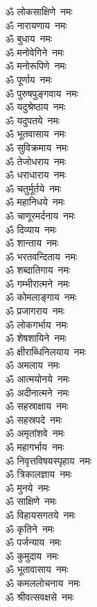 \begin{multicols}{2}
\begin{flushleft}
ॐ लोकसाक्षिणे~नमः\\
ॐ नारायणाय~नमः\\
ॐ बुधाय~नमः\\
ॐ मनोवेगिने~नमः\\
ॐ मनोरूपिणे~नमः\\
ॐ पूर्णाय~नमः\hfill{}\\
ॐ पुरुषपुङ्गवाय~नमः\\
ॐ यदुश्रेष्ठाय~नमः\\
ॐ यदुपतये~नमः\\
ॐ भूतवासाय~नमः\\
ॐ सुविक्रमाय~नमः\\
ॐ तेजोधराय~नमः\\
ॐ धराधाराय~नमः\\
ॐ चतुर्मूर्तये~नमः\\
ॐ महानिधये~नमः\\
ॐ चाणूरमर्दनाय~नमः\hfill{}\\
ॐ दिव्याय~नमः\\
ॐ शान्ताय~नमः\\
ॐ भरतवन्दिताय~नमः\\
ॐ शब्दातिगाय~नमः\\
ॐ गम्भीरात्मने~नमः\\
ॐ कोमलाङ्गाय~नमः\\
ॐ प्रजागराय~नमः\\
ॐ लोकगर्भाय~नमः\\
ॐ शेषशायिने~नमः\\
ॐ क्षीराब्धिनिलयाय~नमः\hfill{}\\
ॐ अमलाय~नमः\\
ॐ आत्मयोनये~नमः\\
ॐ अदीनात्मने~नमः\\
ॐ सहस्राक्षाय~नमः\\
ॐ सहस्रपदे~नमः\\
ॐ अमृतांशवे~नमः\\
ॐ महागर्भाय~नमः\\
ॐ निवृत्तविषयस्पृहाय~नमः\\
ॐ त्रिकालज्ञाय~नमः\\
ॐ मुनये~नमः\hfill{}\\
ॐ साक्षिणे~नमः\\
ॐ विहायसगतये~नमः\\
ॐ कृतिने~नमः\\
ॐ पर्जन्याय~नमः\\
ॐ कुमुदाय~नमः\\
ॐ भूतावासाय~नमः\\
ॐ कमललोचनाय~नमः\\
ॐ श्रीवत्सवक्षसे~नमः\\

\end{flushleft}
\end{multicols}
